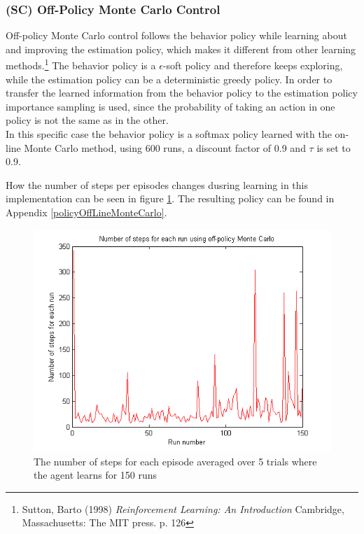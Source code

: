 \documentclass{article}
\begin{document}

\subsubsection{(SC) Off-Policy Monte Carlo Control}\label{sec:exercise4.2}

Off-policy Monte Carlo control follows the behavior policy while learning about and improving the estimation policy, which makes it different from other learning methods.\footnote{Sutton, Barto (1998) \textit{Reinforcement Learning: An Introduction} Cambridge, Massachusetts: The MIT press. p. 126} The behavior policy is a $\epsilon$-soft policy and therefore keeps exploring, while the estimation policy can be a deterministic greedy policy. In order to transfer the learned information from the behavior policy to the estimation policy importance sampling is used, since the probability of taking an action in one policy is not the same as in the other.\\

In this specific case the behavior policy is a softmax policy learned with the on-line Monte Carlo method, using 600 runs, a discount factor of 0.9 and $\tau$ is set to 0.9.

How the number of steps per episodes changes dusring learning in this implementation can be seen in figure \ref{offLine}. The resulting policy can be found in Appendix \ref{policyOffLineMonteCarlo}.

\begin{figure}
\centering
\label{offLine}
\caption{The number of steps for each episode averaged over 5 trials where the agent learns for 150 runs}
\includegraphics[scale=0.8]{offpolicy.png}
\end{figure}
\end{document}
